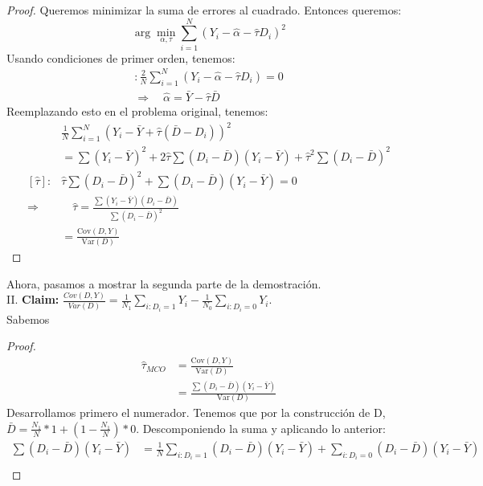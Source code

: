 \documentclass[a4paper, answers, addpoints, 11pt]{exam}
\begin{document}
\begin{itemize}
\begin{mdframed}
\begin{proof}
Queremos minimizar la suma de errores al cuadrado. Entonces queremos:
\begin{equation*}
    \arg \min_{\alpha, \tau} \sum_{i=1}^{N} (Y_i - \hat{\alpha }- \hat{\tau} D_i)^2 
\end{equation*}
Usando condiciones de primer orden, tenemos:
    \begin{align*}
    [\hat{\alpha }]:  \frac{2}{N} \sum_{i=1}^{N} (Y_i - \hat{\alpha } - \hat{\tau} D_i) = 0\\
    \Rightarrow  \quad \hat{\alpha } = \bar{Y} - \hat{\tau}\bar{D}  
    \end{align*}
Reemplazando esto en el problema original, tenemos:
    \begin{align*}
    & \frac{1}{N} \sum_{i=1}^{N} (Y_i - \bar{Y} + \hat{\tau} (\bar{D} - D_i))^2 \\ 
    &= \sum (Y_i - \bar{Y})^2 + 2\hat{\tau} \sum (D_i - \bar{D})(Y_i - \bar{Y}) +\hat{\tau}^2 \sum (D_i - \bar{D})^2 \\  
    [\hat{\tau}]: &  \hat{\tau}\sum (D_i - \bar{D})^2 + \sum (D_i - \bar{D})(Y_i - \bar{Y}) = 0 \\  
    \Rightarrow & \quad \hat{\tau} = \frac{\sum (Y_i - \bar{Y})(D_i - \bar{D})}{\sum (D_i - \bar{D})^2} \\  
    &= \frac{\text{Cov}(D, Y)}{\text{Var}(D)} 
\end{align*}
\end{proof}
    Ahora, pasamos a mostrar la segunda parte de la demostración.\\
     II.  \textbf{Claim:} $\frac{Cov(D, Y)}{Var(D)}= \frac{1}{N_1}\sum_{{i : D_i = 1}} Y_i - \frac{1}{N_0}\sum_{{i : D_i = 0}} Y_i $.\\
     Sabemos
     \begin{proof}
      \begin{align*}
    \hat{\tau}_{MCO} &= \frac{\text{Cov}(D, Y)}{\text{Var}(D)} \\
    &=\frac{\sum (D_i - \bar{D})(Y_i - \bar{Y})}{\text{Var}(D)} 
    \end{align*}
    Desarrollamos primero el numerador. Tenemos que por la construcción de D,  $\bar{D}=\frac{N_1}{N}*1+ (1 - \frac{N_1}{N})*0 $. Descomponiendo la suma y aplicando lo anterior:
    \begin{align*}
\sum (D_i - \bar{D})(Y_i - \bar{Y})
    &= \frac{1}{N} \sum_{i:D_i=1} (D_i - \bar{D})(Y_i - \bar{Y}) + \sum_{i:D_i=0} (D_i - \bar{D})(Y_i - \bar{Y}) \\  

\end{align*}
\end{proof}
\end{mdframed}
\end{itemize}
\end{document}
